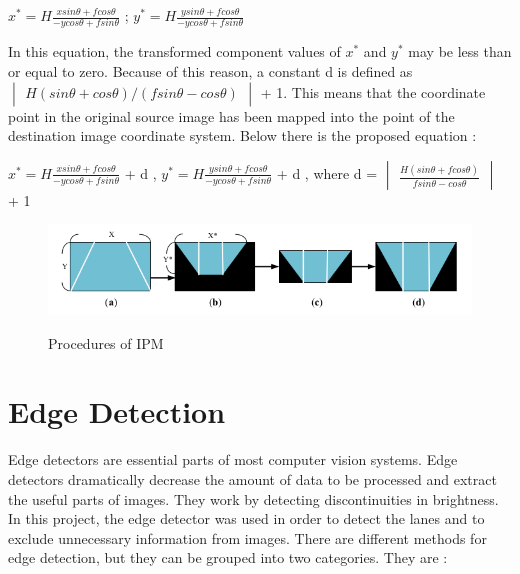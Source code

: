 \begin{center}
 $x^* = H \frac{x sin \theta + f cos \theta}{-y cos \theta + f sin \theta}$ ;
 $y^* = H \frac{y sin \theta + f cos \theta}{-y cos \theta + f sin \theta}$ 
\end{center}

In this equation, the transformed component values of $x^*$ and $y^*$ may be less than or equal to zero. Because of 
this reason, a constant d is defined as $
\begin{vmatrix}
H(sin \theta + cos \theta)/(f sin \theta - cos \theta) 
\end{vmatrix}
$  + 1. This means that the coordinate point in the original source image has been mapped into the point of the destination image coordinate system. Below there is the proposed equation :
 
 \begin{center}
 $x^* = H \frac{x sin \theta + f cos \theta}{-y cos \theta + f sin \theta}$ + d ,
 $y^* = H \frac{y sin \theta + f cos \theta}{-y cos \theta + f sin \theta}$ + d ,
 where d = 
 $\begin{vmatrix}
 \frac{H(sin \theta + f cos \theta)}{f sin \theta - cos \theta}
 \end{vmatrix}$ + 1
\end{center}

\begin{figure}[H]
 \centering
  \includegraphics[width=1\textwidth]{./Bilder/Procedures_of_IPM.png}\label{Procedures_of_IPM}
  \caption{Procedures of IPM}
\end{figure}


%
\section{Edge Detection}\label{sec:Edge Detection}
%

Edge detectors are essential parts of most computer vision systems. Edge detectors dramatically decrease the amount of data to be processed and extract the useful parts of images. They work by detecting discontinuities in brightness. In this project, the edge detector was used in order to detect the lanes and to exclude unnecessary information from images. There are different methods for edge detection, but they can be grouped into two categories. They are :


